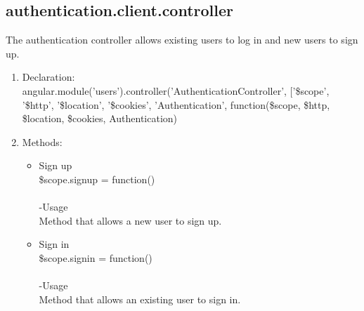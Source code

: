 \documentclass[a4paper,12pt]{article}
\begin{document}
\subsection{authentication.client.controller}
The authentication controller allows existing users to log in and new users to sign up.
\begin{enumerate}
\item Declaration: \\angular.module('users').controller('AuthenticationController', ['\$scope', '\$http', '\$location', '\$cookies', 'Authentication',
	function(\$scope, \$http, \$location, \$cookies, Authentication)
\item Methods:
	\begin{itemize}
 	\item Sign up \\
	 \$scope.signup = function()\\  \\
 	-Usage\\
	 Method that allows a new user to sign up.
	 \item Sign in\\
  	\$scope.signin = function()\\ \\
	 -Usage\\
 	Method that allows an existing user to sign in.
 \end{itemize}	
\end{enumerate}
\end{document}

